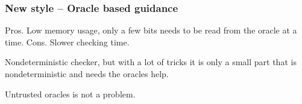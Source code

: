 \documentclass[slidestop,compress,mathserif]{beamer}
\begin{document}
\begin{frame} 
  \frametitle{New style -- Oracle based guidance}

  Pros.
     Low memory usage, only a few bits needs to be read from the oracle at a time.
  Cons.
     Slower checking time.
     

  Nondeterministic checker, but with a lot of tricks it is only a small part
  that is nondeterministic and needs the oracles help.

  Untrusted oracles is not a problem.

  
  
\end{frame}

\end{document}
